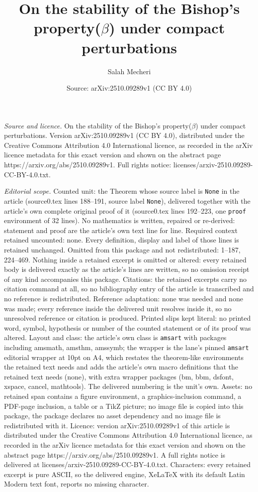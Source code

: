 \documentclass[10pt,a4paper]{amsart}
\title[On the stability of the Bishop's property($\beta$) under com]{On the stability of the Bishop's property($\beta$) under compact perturbations}
\author{Salah Mecheri}
\date{Source: arXiv:2510.09289v1 (CC BY 4.0)}
\begin{document}
\maketitle

\noindent\emph{Source and licence.} On the stability of the Bishop's property($\beta$) under compact perturbations. Version arXiv:2510.09289v1 (CC BY 4.0), distributed under the Creative Commons Attribution 4.0 International licence, as recorded in the arXiv licence metadata for this exact version and shown on the abstract page https://arxiv.org/abs/2510.09289v1. Full rights notice: licenses/arxiv-2510.09289-CC-BY-4.0.txt.\par\smallskip

\noindent\textit{Editorial scope.} Counted unit: the Theorem whose source label is \texttt{None} in the article (source0.tex lines 188--191, source label \texttt{None}), delivered together with the article's own complete original proof of it (source0.tex lines 192--223, one \texttt{proof} environment of 32 lines). No mathematics is written, repaired or re-derived: statement and proof are the article's own text line for line. Required context retained uncounted: none. Every definition, display and label of those lines is retained unchanged. Omitted from this package and not redistributed: 1--187, 224--469. Nothing inside a retained excerpt is omitted or altered: every retained body is delivered exactly as the article's lines are written, so no omission receipt of any kind accompanies this package. Citations: the retained excerpts carry no citation command at all, so no bibliography entry of the article is transcribed and no reference is redistributed. Reference adaptation: none was needed and none was made; every reference inside the delivered unit resolves inside it, so no unresolved reference or citation is produced. Printed slips kept literal: no printed word, symbol, hypothesis or number of the counted statement or of its proof was altered. Layout and class: the article's own class is \texttt{amsart} with packages including amsmath, amsthm, amssymb; the wrapper is the lane's pinned \texttt{amsart} editorial wrapper at 10pt on A4, which restates the theorem-like environments the retained text needs and adds the article's own macro definitions that the retained text needs (none), with extra wrapper packages (bm, bbm, dsfont, xspace, cancel, mathtools). The delivered numbering is the unit's own. Assets: no retained span contains a figure environment, a graphics-inclusion command, a PDF-page inclusion, a table or a TikZ picture; no image file is copied into this package, the package declares no asset dependency and no image file is redistributed with it. Licence: version arXiv:2510.09289v1 of this article is distributed under the Creative Commons Attribution 4.0 International licence, as recorded in the arXiv licence metadata for this exact version and shown on the abstract page https://arxiv.org/abs/2510.09289v1. A full rights notice is delivered at licenses/arxiv-2510.09289-CC-BY-4.0.txt. Characters: every retained excerpt is pure ASCII, so the delivered engine, XeLaTeX with its default Latin Modern text font, reports no missing character.
\end{document}

